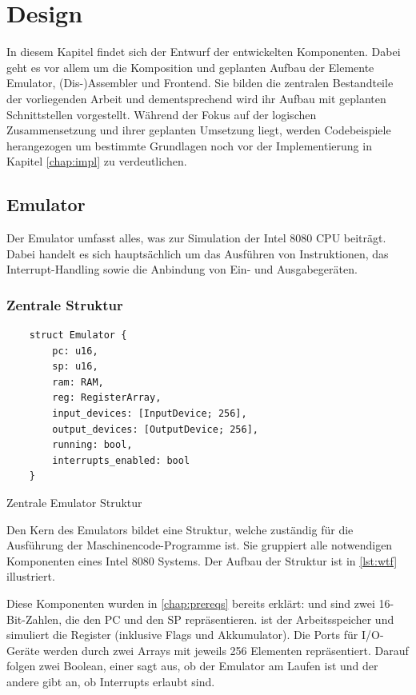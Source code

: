 \chapter{Design}\label{chap:design}

In diesem Kapitel findet sich der Entwurf der entwickelten Komponenten. Dabei geht es vor allem um die Komposition und geplanten Aufbau der Elemente Emulator, (Dis-)Assembler und Frontend. Sie bilden die zentralen Bestandteile der vorliegenden Arbeit und dementsprechend wird ihr Aufbau mit geplanten Schnittstellen vorgestellt. Während der Fokus auf der logischen Zusammensetzung und ihrer geplanten Umsetzung liegt, werden Codebeispiele herangezogen um bestimmte Grundlagen noch vor der Implementierung in Kapitel \ref{chap:impl} zu verdeutlichen.

\section{Emulator}

Der Emulator umfasst alles, was zur Simulation der Intel 8080 \ac{CPU} beiträgt. Dabei handelt es sich hauptsächlich um das Ausführen von Instruktionen, das Interrupt-Handling sowie die Anbindung von Ein- und Ausgabegeräten.

\subsection{Zentrale Struktur}

\begin{listing}[ht]
\begin{verbatim}
    struct Emulator {
        pc: u16,
        sp: u16,
        ram: RAM,
        reg: RegisterArray,
        input_devices: [InputDevice; 256],
        output_devices: [OutputDevice; 256],
        running: bool,
        interrupts_enabled: bool
    }
\end{verbatim}
\centering
\caption{Zentrale Emulator Struktur}
\label{lst:wtf}
\end{listing}

Den Kern des Emulators bildet eine Struktur, welche zuständig für die Ausführung der Maschinencode-Programme ist. Sie gruppiert alle notwendigen Komponenten eines Intel 8080 Systems. Der Aufbau der Struktur ist in \cref{lst:wtf} illustriert.

Diese Komponenten wurden in \cref{chap:prereqs} bereits erklärt:  und  sind zwei 16-Bit-Zahlen, die den \ac{PC} und den \ac{SP} repräsentieren.  ist der Arbeitsspeicher und  simuliert die Register (inklusive Flags und Akkumulator).
Die Ports für I/O-Geräte werden durch zwei Arrays mit jeweils 256 Elementen repräsentiert.
Darauf folgen zwei Boolean, einer sagt aus, ob der Emulator am Laufen ist und der andere gibt an, ob Interrupts erlaubt sind.


